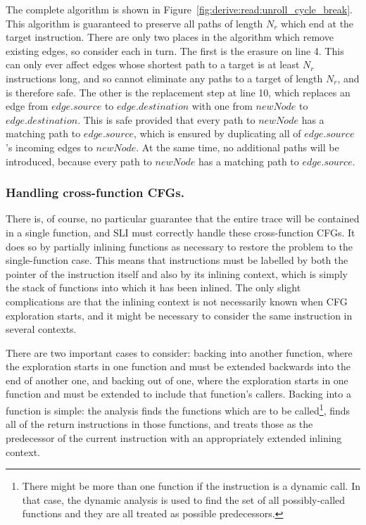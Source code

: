 The complete algorithm is shown in
Figure~\ref{fig:derive:read:unroll_cycle_break}.  This algorithm is
guaranteed to preserve all paths of length $N_r$ which end at the
target instruction.  There are only two places in the algorithm which
remove existing edges, so consider each in turn.  The first is the
erasure on line 4.  This can only ever affect edges whose shortest
path to a target is at least $N_r$ instructions long, and so cannot
eliminate any paths to a target of length $N_r$, and is therefore
safe.  The other is the replacement step at line 10, which replaces an
edge from $edge.source$ to $edge.destination$ with one from $newNode$
to $edge.destination$.  This is safe provided that every path to
$newNode$ has a matching path to $edge.source$, which is ensured by
duplicating all of $edge.source$'s incoming edges to $newNode$.  At
the same time, no additional paths will be introduced, because every
path to $newNode$ has a matching path to $edge.source$.


\subsubsection{Handling cross-function CFGs.}

There is, of course, no particular guarantee that the entire
trace will be contained in a single function, and
SLI must correctly handle these cross-function CFGs.  It does so by
partially inlining functions as necessary to restore the problem to
the single-function case.  This means that instructions must be
labelled by both the pointer of the instruction itself and also by its
inlining context, which is simply the stack of functions into which it
has been inlined.  The only slight
complications are that the inlining context is not necessarily known
when CFG exploration starts, and it might be necessary to consider the
same instruction in several contexts.

There are two important cases to consider: backing into another
function, where the exploration starts in one function and must be
extended backwards into the end of another one, and backing out of
one, where the exploration starts in one function and must be extended
to include that function's callers.  Backing into a function is
simple: the analysis finds the functions which are to be
called\footnote{There might be more than one function if the
  instruction is a dynamic call.  In that case, the dynamic analysis
  is used to find the set of all possibly-called functions and they
  are all treated as possible predecessors.}, finds all of the return
instructions in those functions, and treats those as the predecessor
of the current instruction with an appropriately extended inlining
context.

